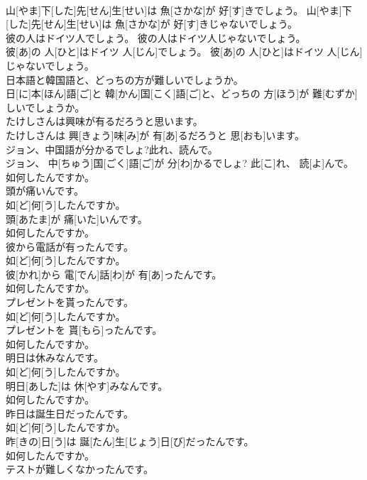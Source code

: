 \documentclass[8pt]{extreport}
\begin{document}
\begin{CJK}{UTF8}{min}
\\	山[やま]下[した]先[せん]生[せい]は 魚[さかな]が 好[す]きでしょう。 山[やま]下[した]先[せん]生[せい]は 魚[さかな]が 好[す]きじゃないでしょう。
\\	彼の人はドイツ人でしょう。 彼の人はドイツ人じゃないでしょう。	
\\	彼[あ]の 人[ひと]はドイツ 人[じん]でしょう。 彼[あ]の 人[ひと]はドイツ 人[じん]じゃないでしょう。
\\	日本語と韓国語と、どっちの方が難しいでしょうか。	
\\	日[に]本[ほん]語[ご]と 韓[かん]国[こく]語[ご]と、どっちの 方[ほう]が 難[むずか]しいでしょうか。
\\	たけしさんは興味が有るだろうと思います。	
\\	たけしさんは 興[きょう]味[み]が 有[あ]るだろうと 思[おも]います。
\\	ジョン、中国語が分かるでしょ?此れ、読んで。	
\\	ジョン、 中[ちゅう]国[ごく]語[ご]が 分[わ]かるでしょ? 此[こ]れ、 読[よ]んで。
\\	如何したんですか。 
\\	頭が痛いんです。	
\\	如[ど]何[う]したんですか。 
\\	頭[あたま]が 痛[いた]いんです。
\\	如何したんですか。 
\\	彼から電話が有ったんです。	
\\	如[ど]何[う]したんですか。 
\\	彼[かれ]から 電[でん]話[わ]が 有[あ]ったんです。
\\	如何したんですか。 
\\	プレゼントを貰ったんです。	
\\	如[ど]何[う]したんですか。 
\\	プレゼントを 貰[もら]ったんです。
\\	如何したんですか。 
\\	明日は休みなんです。	
\\	如[ど]何[う]したんですか。 
\\	明日[あした]は 休[やす]みなんです。
\\	如何したんですか。 
\\	昨日は誕生日だったんです。	
\\	如[ど]何[う]したんですか。 
\\	昨[きの]日[う]は 誕[たん]生[じょう]日[び]だったんです。
\\	如何したんですか。 
\\	テストが難しくなかったんです。	

\end{CJK}
\end{document}
